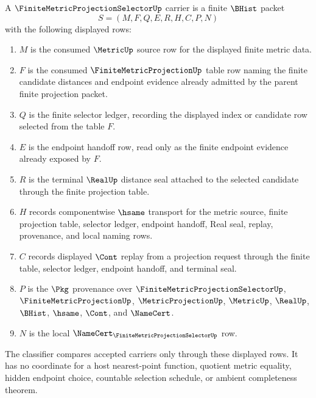 \begin{definition}
\label{def:finite-metric-projection-selector-carrier}
A $\FiniteMetricProjectionSelectorUp$ carrier is a finite $\BHist$ packet
$$
S=(M,F,Q,E,R,H,C,P,N)
$$
with the following displayed rows:
\begin{enumerate}
\item $M$ is the consumed $\MetricUp$ source row for the displayed finite metric data.
\item $F$ is the consumed $\FiniteMetricProjectionUp$ table row naming the finite candidate distances and endpoint evidence already admitted by the parent finite projection packet.
\item $Q$ is the finite selector ledger, recording the displayed index or candidate row selected from the table $F$.
\item $E$ is the endpoint handoff row, read only as the finite endpoint evidence already exposed by $F$.
\item $R$ is the terminal $\RealUp$ distance seal attached to the selected candidate through the finite projection table.
\item $H$ records componentwise $\hsame$ transport for the metric source, finite projection table, selector ledger, endpoint handoff, Real seal, replay, provenance, and local naming rows.
\item $C$ records displayed $\Cont$ replay from a projection request through the finite table, selector ledger, endpoint handoff, and terminal seal.
\item $P$ is the $\Pkg$ provenance over $\FiniteMetricProjectionSelectorUp$, $\FiniteMetricProjectionUp$, $\MetricProjectionUp$, $\MetricUp$, $\RealUp$, $\BHist$, $\hsame$, $\Cont$, and $\NameCert$.
\item $N$ is the local $\NameCert_{\FiniteMetricProjectionSelectorUp}$ row.
\end{enumerate}
The classifier compares accepted carriers only through these displayed rows. It has no coordinate for a host nearest-point function, quotient metric equality, hidden endpoint choice, countable selection schedule, or ambient completeness theorem.
\end{definition}

